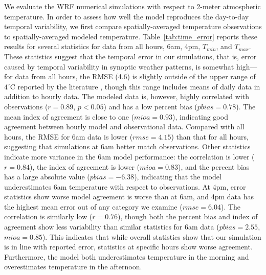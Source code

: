 We evaluate the WRF numerical simulations with respect to 2-meter atmospheric temperature. In order to assess how well the model reproduces the day-to-day temporal variability, we first compare spatially-averaged temperature observations to spatially-averaged modeled temperature. 
Table~\ref{tab:time_error} reports these results for several statistics for data from all hours, 6am, 4pm, $T_{min}$, and $T_{max}$.  
These statistics suggest that the temporal error in our simulations, that is, error caused by temporal variability in synoptic weather patterns, is somewhat high---for data from all hours, the RMSE (4.6) is slightly outside of the upper range of $4^\circ$C reported by the literature \citep{kim2013evaluation}, though this range includes means of daily data in addition to hourly data.
The modeled data is, however, highly correlated with observations ($r=0.89$, $p<0.05$) and has a low percent bias ($pbias = 0.78$). The mean index of agreement is close to one ($mioa=0.93$), indicating good agreement between hourly model and observational data.
Compared with all hours, the RMSE for 6am data is lower ($rmse= 4.15$) than that for all hours, suggesting that simulations at 6am better match observations. 
Other statistics indicate more variance in the 6am model performance: the correlation is lower ($r=0.84$), the index of agreement is lower ($mioa=0.83$), and the percent bias has a large absolute value ($pbias=-6.38$), indicating that the model underestimates 6am temperature with respect to observations. 
%
At 4pm, error statistics show worse model agreement is worse than at 6am,  %
and 4pm data has the highest mean error out of any category we examine ($rmse=6.04$). The correlation is similarly low ($r=0.76$), though both the percent bias and index of agreement show less variability than similar statistics for 6am data ($pbias=2.55$, $mioa=0.85$). This indicates that while overall statistics show that our simulation is in line with reported error, statistics at specific hours show worse agreement. Furthermore, the model both underestimates temperature in the morning and overestimates temperature in the afternoon. %

